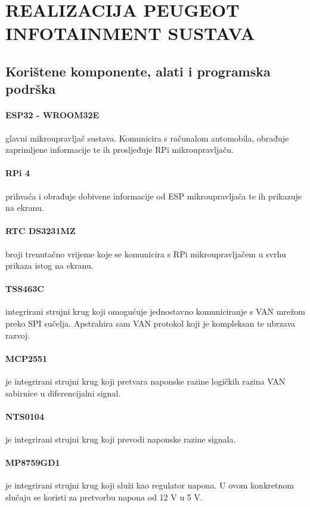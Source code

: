\newpage

\section{REALIZACIJA PEUGEOT INFOTAINMENT SUSTAVA}
\subsection{Korištene komponente, alati i programska podrška}
\paragraph{ESP32 - WROOM32E} glavni mikroupravljač sustava. Komunicira s računalom automobila, obrađuje zaprimljene informacije te ih prosljeđuje RPi mikroupravljaču.
\paragraph{RPi 4} prihvaća i obrađuje dobivene informacije od ESP mikroupravljača te ih prikazuje na ekranu.
\paragraph{RTC DS3231MZ} broji trenutačno vrijeme koje se komunicira s RPi mikroupravljačem u svrhu prikaza istog na ekranu.
\paragraph{TSS463C} integrirani strujni krug koji omogućuje jednostavno komuniciranje s VAN mrežom preko SPI sučelja. Apstrahira sam VAN protokol koji je kompleksan te ubrzava razvoj.
\paragraph{MCP2551}je integrirani strujni krug koji pretvara naponske razine logičkih razina VAN sabirnice u diferencijalni signal.
\paragraph{NTS0104}je integrirani strujni krug koji prevodi naponske razine signala.
\paragraph{MP8759GD1}je integrirani strujni krug koji služi kao regulator napona. U ovom konkretnom slučaju se koristi za pretvorbu napona od 12 V u 5 V.
